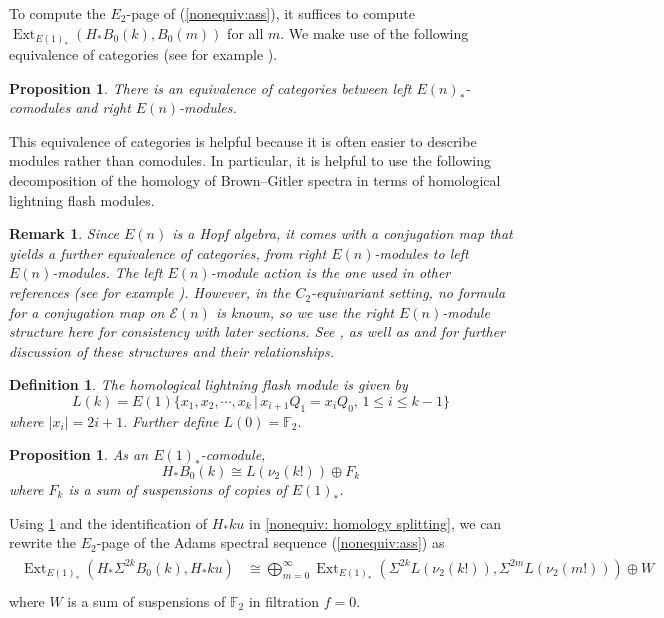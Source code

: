\documentclass{amsart}
\newtheorem{proposition}[equation]{Proposition}
\newtheorem{definition}[equation]{Definition}
\newtheorem{remark}[equation]{Remark}
\theoremstyle{plain}
\numberwithin{equation}{section}
\numberwithin{figure}{section}
\DeclareMathOperator{\Ext}{Ext}
\newcommand{\mF}{{\mathbb F}}
\newcommand{\cE}{{\mathcal E}}
\newcommand{\0}{\langle 0 \rangle }
\begin{document}
To compute the $E_{2}$-page of (\ref{nonequiv:ass}), it suffices to compute $\Ext_{E(1)_{*}}(H_{*}B_{0}(k), B_{0}(m))$ for all $m$. We make use of the following equivalence of categories (see for example \cite[Theorem 4.7]{BrzezinskiWisbauer03}).

\begin{proposition}\label{prop:classical equiv of cat}
    There is an equivalence of categories between left $E(n)_{*}$-comodules and right $E(n)$-modules.
\end{proposition}

This equivalence of categories is helpful because it is often easier to describe modules rather than comodules. In particular, it is helpful to use the following decomposition of the homology of Brown--Gitler spectra in terms of homological lightning flash modules.

\begin{remark}
    \rm{Since $E(n)$ is a Hopf algebra, it comes with a conjugation map that yields a further equivalence of categories, from right $E(n)$-modules to left $E(n)$-modules. The left $E(n)$-module action is the one used in other references (see for example \cite{Culverp219}). However, in the $C_2$-equivariant setting, no formula for a conjugation map on $\cE(n)$ is known, so we use the right $E(n)$-module structure here for consistency with later sections. See \cite[Section~6]{Boardman82}, as well as \cite{bhattacharya2024steenrod} and \cite[Thm~4.7]{BrzezinskiWisbauer03} for further discussion of these structures and their relationships.}
\end{remark}

\begin{definition}\label{def:classicalLightning}
    The homological lightning flash module is given by 
    $$L(k) = E(1) \{x_1, x_2, \cdots, x_k \, |\,  x_{i + 1} Q_1 =  x_i Q_0,\,  1 \leq i \leq k-1 \}$$
    where $| x_i| = 2i + 1.$ Further define $L(0) = \mF_2.$
\end{definition}  


\begin{proposition}\label{nonequiv: homology}
    As an $E(1)_{*}$-comodule, \[H_{*}B_{0}(k) \cong L(\nu_{2}(k!)) \oplus F_{k}\] where $F_{k}$ is a sum of suspensions of copies of $E(1)_{*}$.
\end{proposition}
Using \cref{nonequiv: homology} and the identification of $H_* ku$ in \cref{nonequiv: homology splitting},  we can rewrite the $E_{2}$-page of the Adams spectral sequence (\ref{nonequiv:ass}) as 
\begin{align} \label{nonequiv:E2}
\begin{split}
    \Ext_{E(1)_{*}}\left(H_{*}\Sigma^{2k}B_{0}(k), H_{*}ku\right) & \cong \bigoplus\limits_{m=0}^{\infty}\Ext_{E(1)_{*}}\left(\Sigma^{2k}L(\nu_{2}(k!)), \Sigma^{2m}L(\nu_{2}(m!)) \right)  \oplus W \\
\end{split}
\end{align}
where $W$ is a sum of suspensions of $\mF_{2}$ in filtration $f=0$. 
\end{document}
